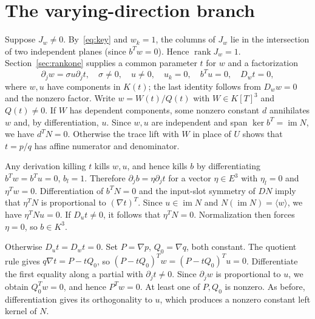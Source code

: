 \documentclass[11pt,a4paper]{article}
\newcommand{\rank}{\operatorname{rank}}
\newcommand{\im}{\operatorname{im}}
\begin{document}
\section{The varying-direction branch}
Suppose $J_w\ne0$. By~\eqref{eq:key} and $w_k=1$, the columns of $J_w$ lie in the intersection of two independent planes (since $b^Tw=0$). Hence $\rank J_w=1$. Section~\ref{sec:rankone} supplies a common parameter $t$ for $w$ and a factorization
\[
 \partial_jw=\sigma u\partial_jt,\quad \sigma\ne0,\quad u\ne0,\quad
 u_k=0,\quad b^Tu=0,\quad D_wt=0,
\]
where $w,u$ have components in $K(t)$; the last identity follows from $D_ww=0$ and the nonzero factor. Write $w=W(t)/Q(t)$ with $W\in K[T]^3$ and $Q(t)\ne0$. If $W$ has dependent components, some nonzero constant $d$ annihilates $w$ and, by differentiation, $u$. Since $w,u$ are independent and span $\ker b^T=\im N$, we have $d^TN=0$. Otherwise the trace lift with $W$ in place of $U$ shows that $t=p/q$ has affine numerator and denominator.

Any derivation killing $t$ kills $w,u$, and hence kills $b$ by differentiating $b^Tw=b^Tu=0$, $b_l=1$. Therefore $\partial_j b=\eta\partial_jt$ for a vector $\eta\in E^3$ with $\eta_l=0$ and $\eta^Tw=0$. Differentiation of $b^TN=0$ and the input-slot symmetry of $DN$ imply that $\eta^TN$ is proportional to $(\nabla t)^T$. Since $u\in\im N$ and $N(\im N)=\langle w\rangle$, we have $\eta^TNu=0$. If $D_ut\ne0$, it follows that $\eta^TN=0$. Normalization then forces $\eta=0$, so $b\in K^3$.

Otherwise $D_ut=D_wt=0$. Set $P=\nabla p$, $Q_0=\nabla q$, both constant. The quotient rule gives $q\nabla t=P-tQ_0$, so $(P-tQ_0)^Tw=(P-tQ_0)^Tu=0$. Differentiate the first equality along a partial with $\partial_jt\ne0$. Since $\partial_jw$ is proportional to $u$, we obtain $Q_0^Tw=0$, and hence $P^Tw=0$. At least one of $P,Q_0$ is nonzero. As before, differentiation gives its orthogonality to $u$, which produces a nonzero constant left kernel of $N$.
\end{document}

